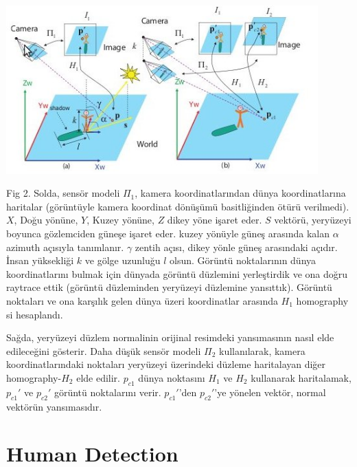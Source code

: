 \documentclass{beamer}
\begin{document}
\begin{frame}[allowframebreaks]
	\includegraphics[width=0.9\textwidth]{img/fig2.jpg}

	\begin{scriptsize}
		Fig 2.
		Solda, sensör modeli $\Pi_1$, kamera koordinatlarından dünya koordinatlarına
		haritalar (görüntüyle kamera koordinat dönüşümü basitliğinden ötürü
		verilmedi). $X$, Doğu yönüne, $Y$, Kuzey yönüne, $Z$ dikey yöne işaret eder.
		$S$ vektörü, yeryüzeyi boyunca gözlemciden güneşe işaret eder. kuzey yönüyle
		güneş arasında kalan $\alpha$ azimuth açısıyla tanımlanır. $\gamma$ zentih
		açısı, dikey yönle güneş arasındaki açıdır. İnsan yüksekliği $k$ ve gölge
		uzunluğu $l$ olsun. Görüntü noktalarının dünya koordinatlarını bulmak için
		dünyada görüntü düzlemini yerleştirdik ve ona doğru raytrace ettik (görüntü
		düzleminden yeryüzeyi düzlemine yansıttık). Görüntü noktaları ve ona
		karşılık gelen dünya üzeri koordinatlar arasında $H_1$ homography si
		hesaplandı.

		Sağda, yeryüzeyi düzlem normalinin orijinal resimdeki yansımasının nasıl
		elde edileceğini gösterir. Daha düşük sensör modeli $\Pi_2$ kullanılarak,
		kamera koordinatlarındaki noktaları yeryüzeyi üzerindeki düzleme haritalayan
		diğer homography-$H_2$ elde edilir. $p_{c1}$ dünya noktasını $H_1$ ve $H_2$
		kullanarak haritalamak, $p_{c1}'$ ve $p_{c2}'$ görüntü noktalarını verir.
		$p_{c1}'$'den $p_{c2}'$'ye yönelen vektör, normal vektörün yansımasıdır.
	\end{scriptsize}

\end{frame}

\section{Human Detection}
\end{document}
